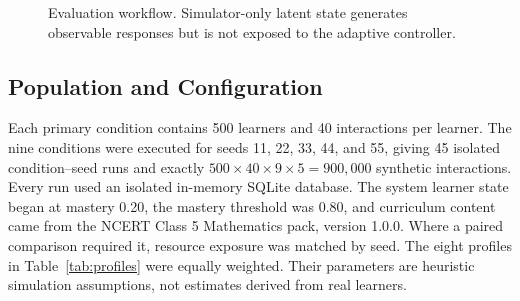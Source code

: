 \documentclass[conference]{IEEEtran}
\begin{document}
\begin{figure}[t]
\centering
{}
\caption{Evaluation workflow. Simulator-only latent state generates observable
responses but is not exposed to the adaptive controller.}
\label{fig:evaluation_workflow}
\end{figure}

\subsection{Population and Configuration}

Each primary condition contains 500 learners and 40 interactions per learner.
The nine conditions were executed for seeds 11, 22, 33, 44, and 55, giving 45
isolated condition--seed runs and exactly
$500\times40\times9\times5=900{,}000$ synthetic interactions. Every run used
an isolated in-memory SQLite database. The system learner state began at
mastery 0.20, the mastery threshold was 0.80, and curriculum content came from
the NCERT Class 5 Mathematics pack, version 1.0.0. Where a paired comparison
required it, resource exposure was matched by seed. The eight profiles in
Table~\ref{tab:profiles} were equally weighted. Their parameters are heuristic
simulation assumptions, not estimates derived from real learners.
\end{document}
